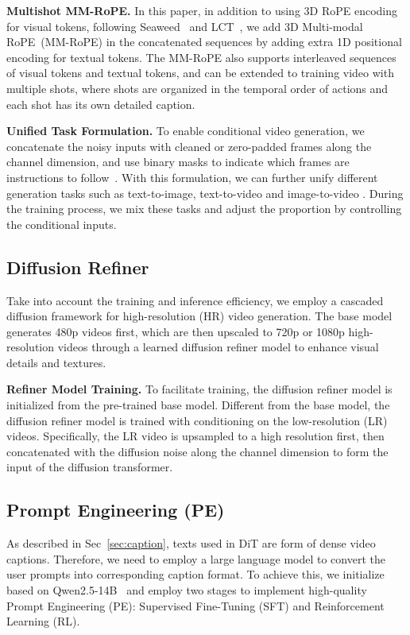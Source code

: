 \textbf{Multishot MM-RoPE.} In this paper, in addition to using 3D RoPE encoding for visual tokens, following Seaweed~\cite{seawead2025seaweed} and LCT~\cite{guo2025long}, we add 3D Multi-modal RoPE~(MM-RoPE) in the concatenated sequences by adding extra 1D positional encoding for textual tokens. The MM-RoPE also supports interleaved sequences of visual tokens and textual tokens, and can be extended to training video with multiple shots, where shots are organized in the temporal order of actions and each shot has its own detailed caption.

\textbf{Unified Task Formulation.} To enable conditional video generation, we concatenate the noisy inputs with cleaned or zero-padded frames along the channel dimension, and use binary masks to indicate which frames are instructions to follow~\cite{girdhar2024factorizing}. With this formulation, we can further unify different generation tasks such as text-to-image, text-to-video and image-to-video \cite{chen2023control}. During the training process, we mix these tasks and adjust the proportion by controlling the conditional inputs.


\subsection{Diffusion Refiner}
Take into account the training and inference efficiency, we employ a cascaded diffusion framework for high-resolution (HR) video generation. The base model generates 480p videos first,  which are then upscaled to 720p or 1080p high-resolution videos through a learned diffusion refiner model to enhance visual details and textures. 

\textbf{Refiner Model Training.} To facilitate training, the diffusion refiner model is initialized from the pre-trained base model. Different from the base model, the diffusion refiner model is trained with conditioning on the low-resolution 
(LR) videos. Specifically, the LR video is upsampled to a high resolution first, then concatenated with the diffusion noise along the channel dimension to form the input of the diffusion transformer. 


\subsection{Prompt Engineering (PE)}
\label{sec:pe}
As described in Sec~\ref{sec:caption}, texts used in DiT are form of dense video captions. Therefore, we need to employ a large language model to convert the user prompts into corresponding caption format. To achieve this, we initialize based on Qwen2.5-14B~\cite{yang2024qwen2_5} and employ two stages to implement high-quality Prompt Engineering (PE): Supervised Fine-Tuning (SFT) and Reinforcement Learning (RL).

